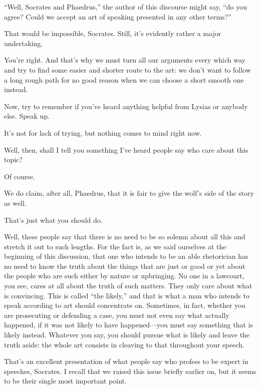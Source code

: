 “Well, Socrates and Phaedrus,” the author of this discourse might say,
“do you agree? Could we accept an art of speaking presented in any other
terms?”

\sayphaedrus That would be impossible, Socrates. Still, it's evidently
rather a major undertaking.

\saysocrates You're right. And that's why we must turn all our arguments
every which way and try to find some easier and shorter route to the
art: we don't want to follow a long rough path for no good
reason when we can choose a short smooth one instead.

Now, try to remember if you've heard anything helpful from Lysias or
anybody else. Speak up.

\sayphaedrus It's not for lack of trying, but nothing comes to mind right
now.

\saysocrates Well, then, shall I tell you something I've heard people say
who care about this topic?

\sayphaedrus Of course.

\saysocrates We do claim, after all, Phaedrus, that it is fair to give the
wolf's side of the story as well.

\sayphaedrus That's just what you should do.

\saysocrates Well, these people say that there is no need to be so solemn
about all this and stretch it out to such lengths. For the fact is, as
we said ourselves at the beginning of this
discussion, that one
who intends to be an able rhetorician has no need to know the truth
about the things that are just or good or yet about the people who are
such either by nature or upbringing. No one in a lawcourt, you see,
cares at all about the truth of such matters. They only care about what
is convincing. This is called “the likely,” and that is what a
man who intends to speak according to art should concentrate on.
Sometimes, in fact, whether you are prosecuting or defending a case, you
must not even say what actually happened, if it was not likely to have
happened---you must say something that is likely instead. Whatever you
say, you should pursue what is likely and leave the truth aside: the
whole art consists in cleaving to that throughout your
speech.

\sayphaedrus That's an excellent presentation of what people say who
profess to be expert in speeches, Socrates. I recall that we raised this
issue briefly earlier on, but it seems to be their single most important
point.


